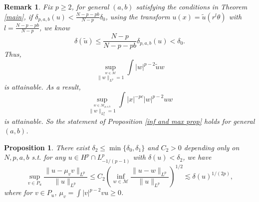 \documentclass[11pt]{article}
\newtheorem{proposition}[theorem]{Proposition}
\newtheorem{remark}[theorem]{Remark}
\numberwithin{equation}{section}
\begin{document}
\begin{remark}
    Fix $p\ge 2$, for general $(a,b)$ satisfying the conditions in Theorem \ref{main}, if $\delta_{p,a,b}(u) < \frac{N-p-pb}{N-p}\delta_0$, using the transform $u(x) = \tilde{u}(r^l\theta)$ with $l=\frac{N-p-pb}{N-p}$, we know
    \[ \delta(\tilde{u}) \le \frac{N-p}{N-p-pb}\delta_{p,a,b}(u) <\delta_0.\]
    Thus,
    \[ \sup_{ \stackrel{w\in \mathcal{M}}{\|w\|_{L^p}=1} } \int |w|^{p-2}\tilde{u}w \]
    is attainable. As a result,
    \[ \sup_{ \stackrel{w\in \mathcal{M}_{p,a,b}}{\|w\|_{L^p_c}=1} } \int |x|^{-pc}|w|^{p-2}uw \]
    is attainable. So the statement of Proposition \ref{inf and max prop} holds for general $(a,b)$.
\end{remark}

\begin{proposition}\label{pro}
    There exist $\delta_2\le \min\{\delta_0,\delta_1\}$ and $C_2>0$ depending only on $N,p,a,b$ s.t. for any $u\in H^p\cap L^p_{-1/(p-1)}$ with $\delta(u) < \delta_2$, we have
    \begin{equation}
        \sup_{v\in P_u}\frac{\|u-\mu_v v\|_{L^p}}{\|u\|_{L^p}}\le C_2 \left(\inf_{w\in\mathcal{M}}\frac{\|u-w\|_{L^p}}{\|u\|_{L^p}}\right)^{1/2} \lesssim \delta(u)^{1/(2p)},
    \end{equation}
    where for $v\in P_u$, $\mu_v = \int |v|^{p-2}vu \ge 0$.
\end{proposition}
\end{document}

